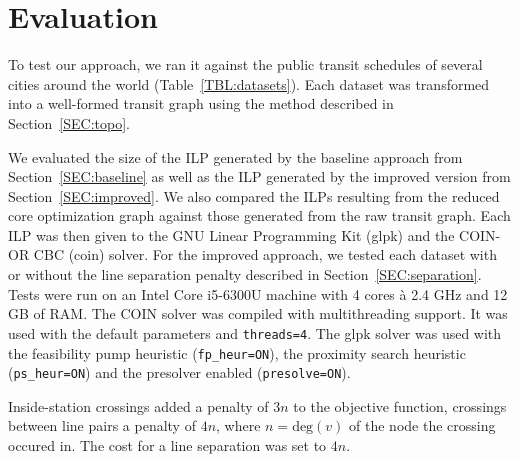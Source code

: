 \documentclass{llncs}
\begin{document}
%
\section{Evaluation}
%

To test our approach, we ran it against the public transit schedules of several cities around the world (Table~\ref{TBL:datasets}). Each dataset was transformed into a well-formed transit graph using the method described in Section~\ref{SEC:topo}.

We evaluated the size of the ILP generated by the baseline approach from Section~\ref{SEC:baseline} as well as the ILP generated by the improved version from Section~\ref{SEC:improved}. We also compared the ILPs resulting from the reduced core optimization graph against those generated from the raw transit graph. Each ILP was then given to the GNU Linear Programming Kit (glpk) and the COIN-OR CBC (coin) solver. For the improved approach, we tested each dataset with or without the line separation penalty described in Section~\ref{SEC:separation}. Tests were run on an Intel Core i5-6300U machine with 4 cores \`{a} 2.4 GHz and 12 GB of RAM. The COIN solver was compiled with multithreading support. It was used with the default parameters and \texttt{threads=4}. The glpk solver was used with the feasibility pump heuristic (\texttt{fp\_heur=ON}), the proximity search heuristic (\texttt{ps\_heur=ON}) and the presolver enabled (\texttt{presolve=ON}).

Inside-station crossings added a penalty of $3n$ to the objective function, crossings between line pairs a penalty of $4n$, where $n = \text{deg}(v)$ of the node the crossing occured in. The cost for a line separation was set to $4n$.

\renewcommand{\thefootnote}{\fnsymbol{footnote}}
\end{document}
